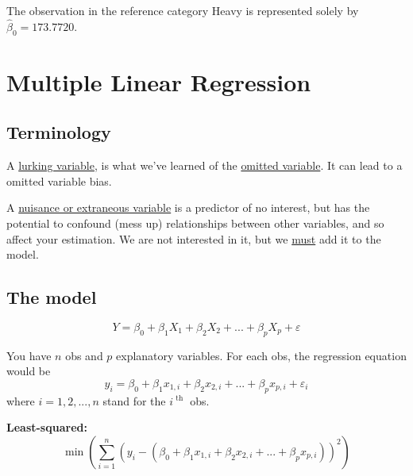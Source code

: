 \documentclass[12pt]{article}
\begin{document}
The observation in the reference category Heavy is represented solely
by $  \widehat{\beta}_{0} = 173.7720 $.




\section{Multiple Linear Regression}


\subsection{Terminology}

A {\underline {lurking variable}}, is what we've learned of the
{\underline {omitted variable}}. It can lead to a omitted variable bias.

A {\underline {nuisance or extraneous variable}} is a predictor of
no interest, but has the potential to confound (mess up) relationships
between other variables, and so affect your estimation. We are not
interested in it, but we {\underline {must}} add it to the model.


\subsection{The model}

\begin{equation*}
Y = \beta_0 + \beta_1 X_1 + \beta_2X_2 + ... + \beta_{p}X_{p} +
\varepsilon
\end{equation*}

You have $ n $ obs and $ p $ explanatory variables. For each obs, the
regression equation would be
\begin{equation*}
		y_{i} = \beta_0 + \beta_1x_{1,i} + \beta_2x_{2,i} + ... + 
		\beta_{p}x_{p,i} + \varepsilon_{i}
\end{equation*}
where $ i = 1,2,...,n $ stand for the $ i^{\text{ th }} $ obs.


{\textbf {Least-squared:}}
\begin{equation*}
\min_{\substack{\\}} \left( 
		\sum\limits_{i = 1} ^n(
		y_{i} - (\beta_0 + \beta_1x_{1,i} + \beta_2x_{2,i} + ... + 
		\beta_{p}x_{p,i})
		)	^{2}
\right)  
\end{equation*}
\end{document}
